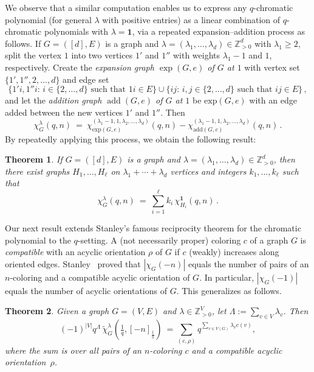 \documentclass[11pt]{amsart}
\newtheorem{theorem}{Theorem} %
\newcommand\add{\operatorname{add}}
\newcommand\ZZ{\mathbb{Z}}
\newcommand\bone{\mathbf{1}}
\begin{document}
We observe that a similar computation enables us to express any $q$-chromatic polynomial (for general $\lambda$ with positive entries) as a linear combination of $q$-chromatic polynomials with $\lambda = \bone$, via a repeated expansion--addition process as follows.
If $G=([d],E)$ is a graph and $\lambda=(\lambda_1,\hdots,\lambda_d)\in \ZZ_{ > 0 }^d$ with $\lambda_1\geq2$, split the vertex $1$ into two vertices $1'$ and $1''$ with weights $\lambda_1-1$ and $1$, respectively. 
Create the \textit{expansion graph $\exp(G,e)$ of $G$ at $1$} with vertex set $\{1',1'',2,\hdots,d\}$ and edge set 
\[
\{1'i, 1''i  : \, i\in \{2,\hdots,d\}\text{ such that } 1i\in E\}\cup \{ij :\,
i,j\in\{2,\hdots,d\}\text{ such that }ij\in E\} \, ,
\]
and let the \textit{addition graph $\add(G,e)$ of $G$ at $1$} be $\text{exp}(G,e)$ with an edge added between the new vertices $1'$ and $1''$. 
Then 
\[
\chi_G^\lambda(q,n) \ = \
\chi_{\text{exp}(G,e)}^{(\lambda_1-1,1,\lambda_2,\hdots,\lambda_d)}(q,n)-\chi_{\text{add}(G,e)}^{(\lambda_1-1,1,\lambda_2,\hdots,\lambda_d)}(q,n)
\, .
\]
By repeatedly applying this process, we obtain the following result:
\begin{theorem}\label{thm:repeated_application}
If $G=([d],E)$ is a graph and $\lambda=(\lambda_1,\hdots,\lambda_d)\in\ZZ_{>0}^d$, then there exist graphs $H_1,\hdots,H_\ell$ on $\lambda_1+\cdots+\lambda_d$ vertices and integers $k_1,\hdots,k_\ell$ such that 
\[
\chi_G^\lambda(q,n) \ = \ \sum_{i=1}^\ell k_i\, \chi^\bone_{H_i}(q,n) \, .
\]
\end{theorem}

Our next result extends Stanley's famous reciprocity theorem for the chromatic polynomial to the $q$-setting. 
A (not necessarily proper) coloring $c$ of a graph $G$ is \emph{compatible} with an acyclic orientation $\rho$ of $G$ if $c$ (weakly) increases along oriented edges. 
Stanley~\cite{stanleyacyclic} proved that $|\chi_G(-n)|$ equals the number of pairs of an $n$-coloring and a compatible acyclic orientation of $G$. 
In particular, $|\chi_G(-1)|$ equals the number of acyclic orientations of $G$.
This generalizes as follows.

\begin{theorem}\label{thm:qchromrec}
Given a graph $G=(V,E)$ and $\lambda \in \ZZ_{>0}^V$, let $\Lambda := \sum_{ v \in V }
\lambda_v$. 
Then
\[
(-1)^{ |V| } q^\Lambda \, \widetilde{\chi}^\lambda_G \left( \tfrac 1q, [-n]_{\frac 1q} \right) \ = \sum_{(c,\rho)} q^{\sum_{v\in V(G)} \lambda_v c(v)},
\]
where the sum is over all pairs of an $n$-coloring $c$ and a compatible acyclic orientation~$\rho$.
\end{theorem}
\end{document}
